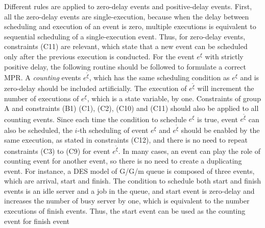 \documentclass[]{interact}
\theoremstyle{plain}%
\theoremstyle{definition}
\theoremstyle{remark}
\begin{document}
Different rules are applied to zero-delay events and positive-delay events. First, all the zero-delay events are single-execution, because when the delay between scheduling and execution of an event is zero, multiple executions is equivalent to sequential scheduling of a single-execution event. Thus, for zero-delay events, constraints (C11) are relevant, which state that a new event can be scheduled only after the previous execution is conducted. For the event $e^{\xi}$ with strictly positive delay, the following routine should be followed to formulate a correct MPR. A \textit{counting} events ${e}^{\tilde{\xi}}$, which has the same  scheduling condition as $e^{\xi}$ and is zero-delay should be included artificially. The execution of ${e}^{\tilde{\xi}}$ will increment the number of executions of $e^{\xi}$, which is a state variable, by one. Constraints of group A and constraints (B1) (C1), (C2), (C10) and (C11) should also be applied to all counting events. Since each time the condition to schedule $e^{\xi}$ is true, event ${e}^{\tilde{\xi}}$ can also be scheduled, the $i$-th scheduling of event $e^{\xi}$ and ${e}^{\tilde{\xi}}$ should be enabled by the same execution, as stated in constraints (C12), and there is no need to repeat constraints (C3) to (C9) for event ${e}^{\tilde{\xi}}$. In many cases, an event can play the role of counting event for another event, so there is no need to create a duplicating event. For instance, a DES model of G/G/m queue is composed of three events, which are arrival, start and finish. The condition to schedule both start and finish events is an idle server and a job in the queue, and start event is zero-delay and increases the number of busy server by one, which is equivalent to the number executions of finish events. Thus, the start event can be used as the counting event for finish event
\end{document}
